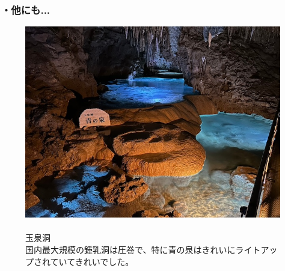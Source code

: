 \documentclass[../main]{subfiles}
\begin{document}
\subsubsection*{・他にも...}
\begin{figure}[H]
  \begin{minipage}[b]{0.48\columnwidth}
    \centering
    \includegraphics[width=\columnwidth]{figure/tamasendou.jpg}
  \end{minipage}
  \hspace{0.04\columnwidth} %
  \begin{minipage}[b]{0.48\columnwidth}
    \caption{\\
    玉泉洞\\
    国内最大規模の鍾乳洞は圧巻で、特に青の泉はきれいにライトアップされていてきれいでした。
    }
  \end{minipage}
\end{figure}
\end{document}
